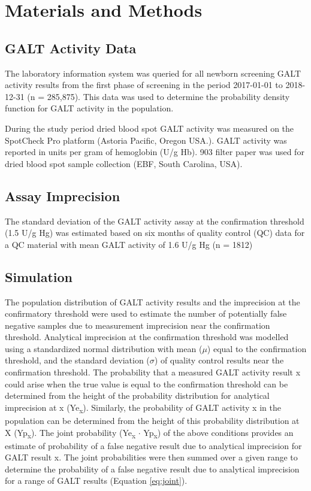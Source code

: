 \documentclass[review]{elsarticle}
\begin{document}
\section*{Materials and Methods}
\label{sec:org16ff13b}
\subsection*{GALT Activity Data}
\label{sec:orgc016f65}
The laboratory information system was queried for all newborn
screening GALT activity results from the first phase of screening in
the period 2017-01-01 to 2018-12-31 (n = 285,875). This data was used
to determine the probability density function for GALT activity in the
population.

During the study period dried blood spot GALT activity was measured
on the SpotCheck Pro platform (Astoria Pacific, Oregon USA.). GALT
activity was reported in units per gram of hemoglobin (U/g Hb). 903
filter paper was used for dried blood spot sample collection (EBF,
South Carolina, USA).

\subsection*{Assay Imprecision}
\label{sec:org05a2706}
The standard deviation of the GALT activity assay at the confirmation
threshold (1.5 U/g Hg) was estimated based on six months of quality
control (QC) data for a QC material with mean GALT activity of 1.6 U/g
Hg (n = 1812)

\subsection*{Simulation}
\label{sec:org18e2bd5}
The population distribution of GALT activity results and the
imprecision at the confirmatory threshold were used to estimate the
number of potentially false negative samples due to measurement
imprecision near the confirmation threshold. Analytical imprecision at
the confirmation threshold was modelled using a standardized normal
distribution with mean (\(\mu\)) equal to the confirmation threshold, and
the standard deviation (\(\sigma\)) of quality control results near the
confirmation threshold. The probability that a measured GALT activity
result x could arise when the true value is equal to the confirmation
threshold can be determined from the height of the probability
distribution for analytical imprecision at x (Ye\textsubscript{x}). Similarly, the
probability of GALT activity x in the population can be determined
from the height of this probability distribution at X (Yp\textsubscript{x}). The
joint probability (Ye\textsubscript{x} \(\cdot\) Yp\textsubscript{x}) of the above conditions provides
an estimate of probability of a false negative result due to analytical
imprecision for GALT result x. The joint probabilities were then
summed over a given range to determine the probability of a false
negative result due to analytical imprecision for a range of GALT
results (Equation \ref{eq:joint}).
\end{document}
